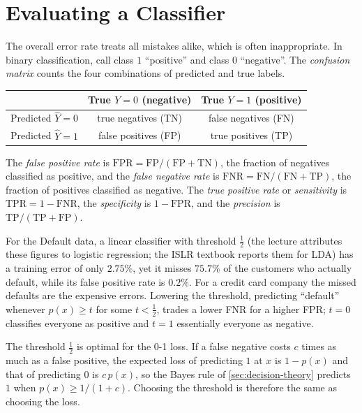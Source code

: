 \section{Evaluating a Classifier}\label{sec:classifier-eval}

The overall error rate treats all mistakes alike, which is often inappropriate. In binary classification, call class $1$ ``positive'' and class $0$ ``negative''. The \emph{confusion matrix} counts the four combinations of predicted and true labels.

\begin{center}
\small
\begin{tabular}{@{}lcc@{}}
\toprule
 & True $Y=0$ (negative) & True $Y=1$ (positive) \\
\midrule
Predicted $\hat Y=0$ & true negatives (TN) & false negatives (FN) \\
Predicted $\hat Y=1$ & false positives (FP) & true positives (TP) \\
\bottomrule
\end{tabular}
\end{center}

\begin{definition}
The \emph{false positive rate} is $\mathrm{FPR}=\mathrm{FP}/(\mathrm{FP}+\mathrm{TN})$, the fraction of negatives classified as positive, and the \emph{false negative rate} is $\mathrm{FNR}=\mathrm{FN}/(\mathrm{FN}+\mathrm{TP})$, the fraction of positives classified as negative. The \emph{true positive rate} or \emph{sensitivity} is $\mathrm{TPR}=1-\mathrm{FNR}$, the \emph{specificity} is $1-\mathrm{FPR}$, and the \emph{precision} is $\mathrm{TP}/(\mathrm{TP}+\mathrm{FP})$.
\end{definition}

For the Default data, a linear classifier with threshold $\frac12$ (the lecture attributes these figures to logistic regression; the ISLR textbook reports them for LDA) has a training error of only $2.75\%$, yet it misses $75.7\%$ of the customers who actually default, while its false positive rate is $0.2\%$. For a credit card company the missed defaults are the expensive errors. Lowering the threshold, predicting ``default'' whenever $\hat p(x)\ge t$ for some $t<\frac12$, trades a lower FNR for a higher FPR; $t=0$ classifies everyone as positive and $t=1$ essentially everyone as negative.

\begin{remark}\label{rem:threshold-cost}
The threshold $\frac12$ is optimal for the 0-1 loss. If a false negative costs $c$ times as much as a false positive, the expected loss of predicting $1$ at $x$ is $1-p(x)$ and that of predicting $0$ is $c\,p(x)$, so the Bayes rule of \cref{sec:decision-theory} predicts $1$ when $p(x)\ge1/(1+c)$. Choosing the threshold is therefore the same as choosing the loss.
\end{remark}

